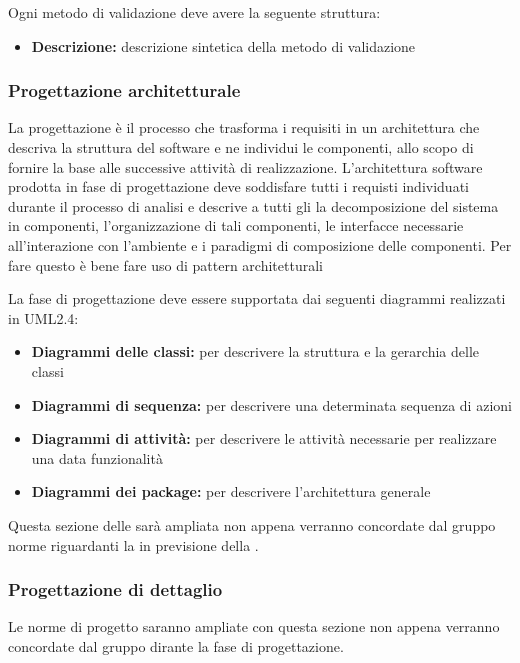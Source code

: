 \documentclass[12pt,a4paper]{article}
\begin{document}
Ogni metodo di validazione deve avere la seguente struttura:
\begin{itemize}
	\item \textbf{Descrizione:} descrizione sintetica della metodo di validazione
\end{itemize}

\subsubsection{Progettazione architetturale}
La progettazione è il processo che trasforma i requisiti in un architettura che descriva la struttura del software e ne individui le componenti, allo scopo di fornire la base alle successive attività di realizzazione. L'architettura software prodotta in fase di progettazione deve soddisfare tutti i requisti individuati durante il processo di analisi e descrive a tutti gli  la decomposizione del sistema in componenti, l'organizzazione di tali componenti, le interfacce necessarie all'interazione con l'ambiente e i paradigmi di composizione delle componenti. Per fare questo è bene fare uso di pattern architetturali

La fase di progettazione deve essere supportata dai seguenti diagrammi realizzati in UML2.4:
\begin{itemize}
	\item \textbf{Diagrammi delle classi:} per descrivere la struttura e la gerarchia delle classi
	\item \textbf{Diagrammi di sequenza:} per descrivere una determinata sequenza di azioni
	\item \textbf{Diagrammi di attività:} per descrivere le attività necessarie per realizzare una data funzionalità
	\item \textbf{Diagrammi dei package:} per descrivere l'architettura generale
\end{itemize}

Questa sezione delle \NdP{} sarà ampliata non appena verranno concordate dal gruppo norme riguardanti la \FPA{} in previsione della \RP.

\subsubsection{Progettazione di dettaglio}
Le norme di progetto saranno ampliate con questa sezione non appena verranno concordate dal gruppo dirante la fase di progettazione.
\end{document}
